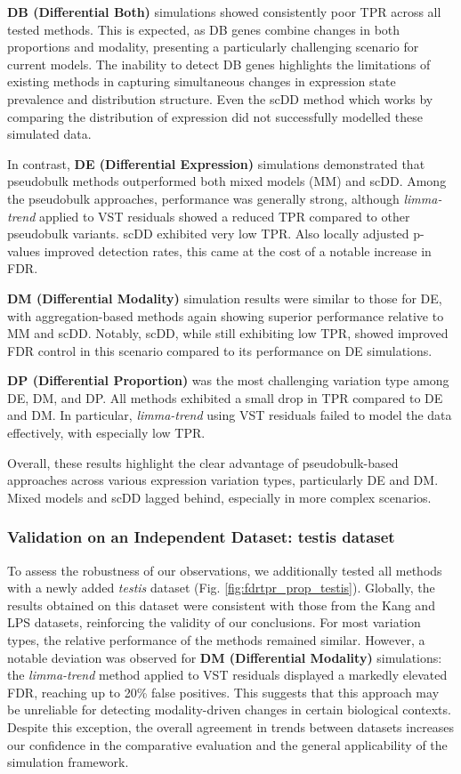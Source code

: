 \documentclass[a4paper, 11pt, twocolumn]{article}
\begin{document}
\begin{multicols}{2}
\textbf{DB (Differential Both)} simulations showed consistently poor TPR across all tested methods. This is expected, as DB genes combine changes in both proportions and modality, presenting a particularly challenging scenario for current models. The inability to detect DB genes highlights the limitations of existing methods in capturing simultaneous changes in expression state prevalence and distribution structure. Even the scDD method which works by comparing the distribution of expression did not successfully modelled these simulated data.

In contrast, \textbf{DE (Differential Expression)} simulations demonstrated that pseudobulk methods outperformed both mixed models (MM) and scDD. Among the pseudobulk approaches, performance was generally strong, although \textit{limma-trend} applied to VST residuals showed a reduced TPR compared to other pseudobulk variants. scDD exhibited very low TPR. Also locally adjusted p-values improved detection rates, this came at the cost of a notable increase in FDR.

\textbf{DM (Differential Modality)} simulation results were similar to those for DE, with aggregation-based methods again showing superior performance relative to MM and scDD. Notably, scDD, while still exhibiting low TPR, showed improved FDR control in this scenario compared to its performance on DE simulations.

\textbf{DP (Differential Proportion)} was the most challenging variation type among DE, DM, and DP. All methods exhibited a small drop in TPR compared to DE and DM. In particular, \textit{limma-trend} using VST residuals failed to model the data effectively, with especially low TPR.

Overall, these results highlight the clear advantage of pseudobulk-based approaches across various expression variation types, particularly DE and DM. Mixed models and scDD lagged behind, especially in more complex scenarios.
\subsubsection{Validation on an Independent Dataset: testis dataset} 
To assess the robustness of our observations, we additionally tested all methods with a newly added \textit{testis} dataset (Fig. \ref{fig:fdrtpr_prop_testis}). Globally, the results obtained on this dataset were consistent with those from the Kang and LPS datasets, reinforcing the validity of our conclusions. For most variation types, the relative performance of the methods remained similar. However, a notable deviation was observed for \textbf{DM (Differential Modality)} simulations: the \textit{limma-trend} method applied to VST residuals displayed a markedly elevated FDR, reaching up to 20\% false positives. This suggests that this approach may be unreliable for detecting modality-driven changes in certain biological contexts. Despite this exception, the overall agreement in trends between datasets increases our confidence in the comparative evaluation and the general applicability of the simulation framework.


\end{multicols}
\end{document}
